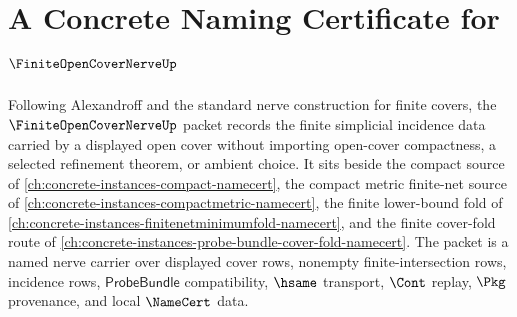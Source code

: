 \chapter{A Concrete Naming Certificate for $\FiniteOpenCoverNerveUp$}
\label{ch:concrete-instances-finite-open-cover-nerve-namecert}

Following Alexandroff and the standard nerve construction for finite covers, the $\FiniteOpenCoverNerveUp$ packet records the finite simplicial incidence data carried by a displayed open cover without importing open-cover compactness, a selected refinement theorem, or ambient choice. It sits beside the compact source of \autoref{ch:concrete-instances-compact-namecert}, the compact metric finite-net source of \autoref{ch:concrete-instances-compactmetric-namecert}, the finite lower-bound fold of \autoref{ch:concrete-instances-finitenetminimumfold-namecert}, and the finite cover-fold route of \autoref{ch:concrete-instances-probe-bundle-cover-fold-namecert}. The packet is a named nerve carrier over displayed cover rows, nonempty finite-intersection rows, incidence rows, $\mathsf{ProbeBundle}$ compatibility, $\hsame$ transport, $\Cont$ replay, $\Pkg$ provenance, and local $\NameCert$ data.


